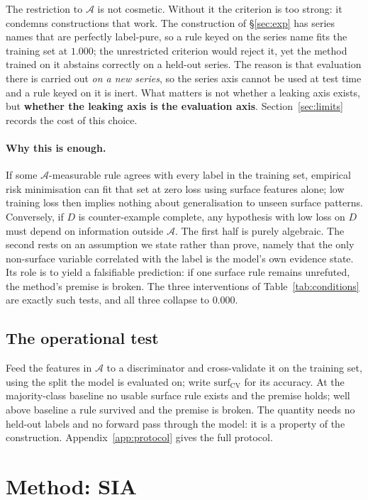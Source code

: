 \documentclass[11pt,a4paper]{article}
\newcommand{\surfcv}{$\mathrm{surf}_\mathrm{CV}$}
\begin{document}
The restriction to $\mathcal A$ is not cosmetic. Without it the criterion is
too strong: it condemns constructions that work. The construction of
\S\ref{sec:exp} has series names
that are perfectly label-pure, so a rule keyed on the series name fits the
training set at $1.000$; the unrestricted criterion would reject it, yet the
method trained on it abstains correctly on a held-out series. The reason is
that evaluation there is carried out \emph{on a new series}, so the series axis
cannot be used at test time and a rule keyed on it is inert. What matters is
not whether a leaking axis exists, but \textbf{whether the leaking axis is the
evaluation axis}. Section~\ref{sec:limits} records the cost of this choice.

\paragraph{Why this is enough.}
If some $\mathcal A$-measurable rule agrees with every label in the training
set, empirical risk minimisation can fit that set at zero loss using surface
features alone; low training loss then implies nothing about generalisation to
unseen surface patterns. Conversely, if $D$ is counter-example complete, any
hypothesis with low loss on $D$ must depend on information outside
$\mathcal A$. The first half is purely algebraic. The second rests on an
assumption we state rather than prove, namely that the only non-surface
variable correlated with the label is the model's own evidence state. Its role
is to yield a falsifiable prediction: if one surface rule remains unrefuted,
the method's premise is broken. The three interventions of
Table~\ref{tab:conditions} are exactly such tests, and all three collapse to
$0.000$.

\subsection{The operational test}

Feed the features in $\mathcal A$ to a discriminator and cross-validate it on
the training set, using the split the model is evaluated on; write \surfcv{}
for its accuracy. At the majority-class baseline no usable surface rule exists
and the premise holds; well above baseline a rule survived and the premise is
broken. The quantity needs no held-out labels and no forward pass through the
model: it is a property of the construction. Appendix~\ref{app:protocol} gives
the full protocol.

\section{Method: SIA}
\label{sec:method}
\end{document}
